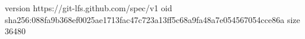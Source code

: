 version https://git-lfs.github.com/spec/v1
oid sha256:088fa9b368ef0025ae1713fac47c723a13ff5c68a9fa48a7e054567054cce86a
size 36480
